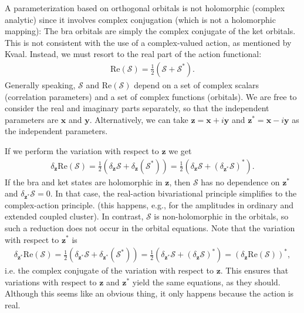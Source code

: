 \documentclass[aip,jcp,preprint,superscriptaddress,nofootinbib]{revtex4-1}
\begin{document}
A parameterization based on orthogonal orbitals is not holomorphic (complex analytic)
since it involves complex conjugation (which is not a holomorphic mapping):
The bra orbitals are simply the complex conjugate of the ket orbitals. This is
not consistent with the use of a complex-valued action, as mentioned by Kvaal.\cite{kvaalInitioQuantumDynamics2012} 
Instead, we must resort to the real part of the action functional:
\begin{align}
    \mathrm{Re}(\mathcal{S}) = \tfrac{1}{2} (\mathcal{S} + \mathcal{S}^*).
\end{align}
Generally speaking, $\mathcal{S}$ and $\mathrm{Re}(\mathcal{S})$ depend on a set of
complex scalars (correlation parameters) and a set of complex functions (orbitals).
We are free to consider the real and imaginary parts separately, so that the independent parameters are
$\mathbf{x}$ and $\mathbf{y}$. Alternatively, we can take $\mathbf{z} = \mathbf{x} + i \mathbf{y}$ 
and $\mathbf{z}^* = \mathbf{x} - i \mathbf{y}$ as the independent parameters.

If we perform the variation with respect to $\mathbf{z}$
we get
\begin{align}
    \delta_{\mathbf{z}} \mathrm{Re}(\mathcal{S}) 
    = \tfrac{1}{2} (\delta_{\mathbf{z}} \mathcal{S} + \delta_{\mathbf{z}} (\mathcal{S}^*))
    = \tfrac{1}{2} (\delta_{\mathbf{z}} \mathcal{S} + (\delta_{\mathbf{z}^*} \mathcal{S})^*).
\end{align}
If the bra and ket states are holomorphic in $\mathbf{z}$, then
$\mathcal{S}$ has no dependence on $\mathbf{z}^*$ and $\delta_{\mathbf{z}^*} \mathcal{S} = 0$.
In that case, the real-action bivariational principle simplifies to the complex-action principle.
(this happens, e.g., for the amplitudes in ordinary and extended coupled cluster). In contrast,
$\mathcal{S}$ is non-holomorphic in the orbitals, so such a reduction does not occur in the orbital equations.
Note that the variation with respect to $\mathbf{z}^*$ is
\begin{align}
    \delta_{\mathbf{z}^*} \mathrm{Re}(\mathcal{S}) 
    = \tfrac{1}{2} (\delta_{\mathbf{z}^*} \mathcal{S} + \delta_{\mathbf{z}^*} (\mathcal{S}^*))
    = \tfrac{1}{2} (\delta_{\mathbf{z}^*} \mathcal{S} + (\delta_{\mathbf{z}} \mathcal{S})^*)
    = (\delta_{\mathbf{z}} \mathrm{Re}(\mathcal{S}))^*,
\end{align}
i.e. the complex conjugate of the variation with respect to $\mathbf{z}$. This ensures
that variations with respect to $\mathbf{z}$ and $\mathbf{z}^*$ yield the same equations,
as they should. Although this seems like an obvious thing, it only happens because the
action is real. 
\end{document}
